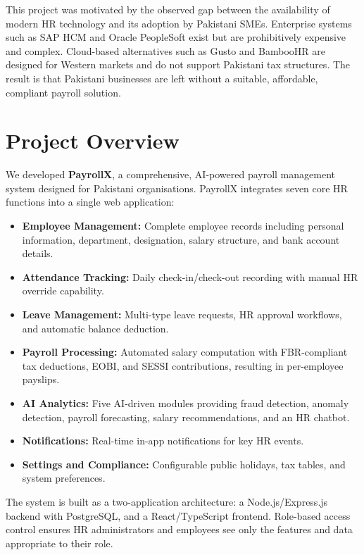 \documentclass[12pt,a4paper]{report}
\begin{document}
This project was motivated by the observed gap between the availability of modern HR technology and its adoption by Pakistani SMEs. Enterprise systems such as SAP HCM and Oracle PeopleSoft exist but are prohibitively expensive and complex. Cloud-based alternatives such as Gusto and BambooHR are designed for Western markets and do not support Pakistani tax structures. The result is that Pakistani businesses are left without a suitable, affordable, compliant payroll solution.

\section{Project Overview}

We developed \textbf{PayrollX}, a comprehensive, AI-powered payroll management system designed for Pakistani organisations. PayrollX integrates seven core HR functions into a single web application:

\begin{itemize}
    \item \textbf{Employee Management:} Complete employee records including personal information, department, designation, salary structure, and bank account details.
    \item \textbf{Attendance Tracking:} Daily check-in/check-out recording with manual HR override capability.
    \item \textbf{Leave Management:} Multi-type leave requests, HR approval workflows, and automatic balance deduction.
    \item \textbf{Payroll Processing:} Automated salary computation with FBR-compliant tax deductions, EOBI, and SESSI contributions, resulting in per-employee payslips.
    \item \textbf{AI Analytics:} Five AI-driven modules providing fraud detection, anomaly detection, payroll forecasting, salary recommendations, and an HR chatbot.
    \item \textbf{Notifications:} Real-time in-app notifications for key HR events.
    \item \textbf{Settings and Compliance:} Configurable public holidays, tax tables, and system preferences.
\end{itemize}

The system is built as a two-application architecture: a Node.js/Express.js backend with PostgreSQL, and a React/TypeScript frontend. Role-based access control ensures HR administrators and employees see only the features and data appropriate to their role.
\end{document}
